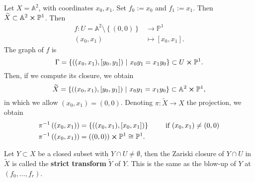 \begin{ex}
	Let $X = \mathbb{A}^{2}$, with coordinates $x_0, x_1$.
	Set $f_0 := x_0$ and $f_1 := x_1$.
	Then $\widetilde{X} \subset \mathbb{A}^{2} \cross \mathbb{P}^{1}$.
	Then
	\begin{align}
		f: U = \mathbb{A}^{2}\setminus \left\{ (0, 0) \right\} &\to \mathbb{P}^{1} \\
		(x_0, x_1) &\mapsto \left[ x_0 , x_1 \right]
	.\end{align} 
	The graph of $f$ is
	\begin{equation}
		\Gamma = \left\{ \left((x_0, x_1), [y_0,y_1] \right) \ \middle|\ 
		x_0y_1 = x_1y_0 \right\} \subset U \cross \mathbb{P}^{1}
	.\end{equation} 
	Then, if we compute its closure, we obtain
	\begin{equation}
		\widetilde{X} = \left\{ \left((x_0, x_1), [y_0,y_1] \right) \ \middle|\ 
		x_0y_1 = x_1y_0 \right\} \subset \mathbb{A}^{2} \cross \mathbb{P}^{1}
	,\end{equation} 
	in which we allow $(x_0, x_1) = (0,0)$.
	Denoting $\pi: \widetilde{X} \to X$ the projection, we obtain
	\begin{align}
		\pi^{-1}\left( (x_0, x_1) \right) &= \left\{ \left((x_0, x_1), [x_0,x_1] \right) \right\}
		\qquad \text{ if } (x_0, x_1) \neq (0,0)\\
		\pi^{-1}\left( (x_0, x_1) \right) &= \left( (0,0) \right) \cross \mathbb{P}^{1} \cong \mathbb{P}^{1}
	.\end{align} 
\end{ex} 

\begin{defn}
	Let $Y \subset X$ be a closed subset with $Y \cap U \neq \emptyset$,
	then the Zariski closure of $Y \cap U$ in $\widetilde{X}$ is called the
	\textbf{strict transform} $\widetilde{Y}$ of $Y$.
	This is the same as the blow-up of $Y$ at $(f_0, \ldots, f_r)$.
\end{defn}

